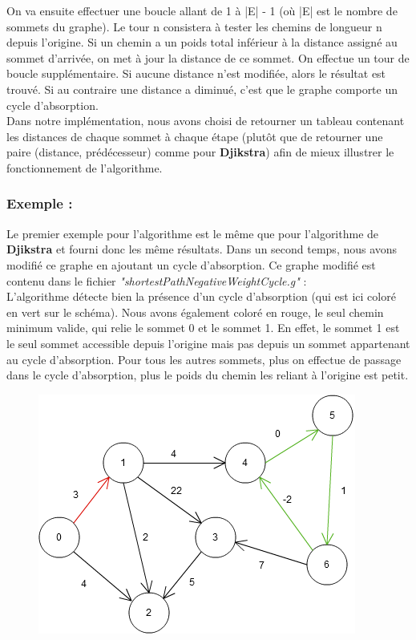 \documentclass[12pt]{article}
\begin{document}
On va ensuite effectuer une boucle allant de 1 à |E| - 1 (où |E| est le nombre de sommets du graphe). Le tour n consistera à tester les chemins de longueur n depuis l'origine. Si un chemin a un poids total inférieur à la distance assigné au sommet d'arrivée, on met à jour la distance de ce sommet.
On effectue un tour de boucle supplémentaire. Si aucune distance n'est modifiée, alors le résultat est trouvé. Si au contraire une distance a diminué, c'est que le graphe comporte un cycle d'absorption. \\

Dans notre implémentation, nous avons choisi de retourner un tableau contenant les distances de chaque sommet à chaque étape (plutôt que de retourner une paire (distance, prédécesseur) comme pour {\bf Djikstra}) afin de mieux illustrer le fonctionnement de l'algorithme. \\

\subsubsection{Exemple :}

Le premier exemple pour l'algorithme est le même que pour l'algorithme de {\bf Djikstra} et fourni donc les même résultats. Dans un second temps, nous avons modifié ce graphe en ajoutant un cycle d'absorption. Ce graphe modifié est contenu dans le fichier {\it "shortestPathNegativeWeightCycle.g"} :\\ 

L'algorithme détecte bien la présence d'un cycle d'absorption (qui est ici coloré en vert sur le schéma).
Nous avons également coloré en rouge, le seul chemin minimum valide, qui relie le sommet 0 et le sommet 1. En effet, le sommet 1 est le seul sommet accessible depuis l'origine mais pas depuis un sommet appartenant au cycle d'absorption. Pour tous les autres sommets, plus on effectue de passage dans le cycle d'absorption, plus le poids du chemin les reliant à l'origine est petit.\\

\clearpage

\begin{figure}[h]
\centering
\includegraphics[scale=.7]{imgs/schema4.png}
\end{figure}
\end{document}
